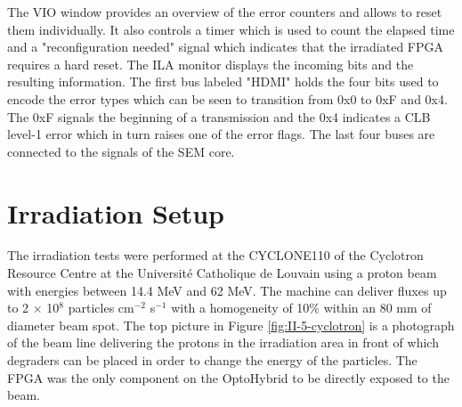       The VIO window provides an overview of the error counters and allows to reset them individually. It also controls a timer which is used to count the elapsed time and a "reconfiguration needed" signal which indicates that the irradiated FPGA requires a hard reset. The ILA monitor displays the incoming bits and the resulting information. The first bus labeled "HDMI" holds the four bits used to encode the error types which can be seen to transition from 0x0 to 0xF and 0x4. The 0xF signals the beginning of a transmission and the 0x4 indicates a CLB level-1 error which in turn raises one of the error flags. The last four buses are connected to the signals of the SEM core.

  \section{Irradiation Setup}

    The irradiation tests were performed at the CYCLONE110 of the Cyclotron Resource Centre at the Université Catholique de Louvain \cite{CYCLOTRON} using a proton beam with energies between 14.4 MeV and 62 MeV. The machine can deliver fluxes up to 2 $ \times $ 10$^8$ particles cm$^{-2}$ s$^{-1}$ with a homogeneity of 10\% within an 80 mm of diameter beam spot. The top picture in Figure \ref{fig:II-5-cyclotron} is a photograph of the beam line delivering the protons in the irradiation area in front of which degraders can be placed in order to change the energy of the particles. The FPGA was the only component on the OptoHybrid to be directly exposed to the beam. \\

